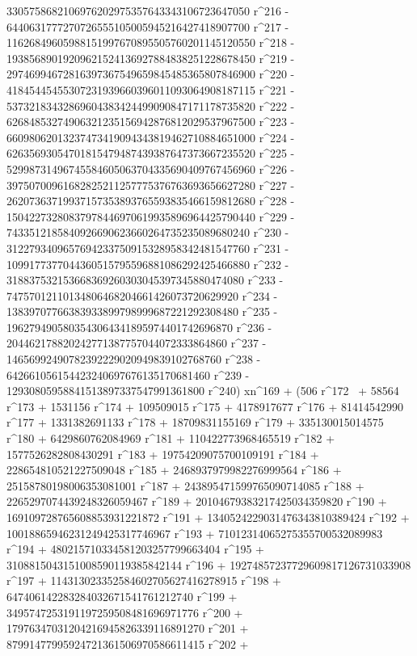        3305758682106976202975357643343106723647050 r^216 - 
       6440631777270726555105005945216427418907700 r^217 - 
       11626849605988151997670895505760201145120550 r^218 - 
       19385689019209621524136927884838251228678450 r^219 - 
       29746994672816397367549659845485365807846900 r^220 - 
       41845445455307231939660396011093064908187115 r^221 - 
       53732183432869604383424499090847171178735820 r^222 - 
       62684853274906321235156942876812029537967500 r^223 - 
       66098062013237473419094343819462710884651000 r^224 - 
       62635693054701815479487439387647373667235520 r^225 - 
       52998731496745584605063704335690409767456960 r^226 - 
       39750700961682825211257775376763693656627280 r^227 - 
       26207363719937157353893765593835466159812680 r^228 - 
       15042273280837978446970619935896964425790440 r^229 - 
       7433512185840926690623660264735235089680240 r^230 - 
       3122793409657694233750915328958342481547760 r^231 - 
       1099177377044360515795596881086292425466880 r^232 - 
       318837532153668369260303045397345880474080 r^233 - 
       74757012110134806468204661426073720629920 r^234 - 
       13839707766383933899798999687221292308480 r^235 - 
       1962794905803543064341895974401742696870 r^236 - 
       204462178820242771387757044072333864860 r^237 - 
       14656992490782392229020949839102768760 r^238 - 
       642661056154423240697676135170681460 r^239 - 
       12930805958841513897337547991361800 r^240) xn^169 + (506 r^172 \
+ 58564 r^173 + 1531156 r^174 + 109509015 r^175 + 4178917677 r^176 + 
       81414542990 r^177 + 1331382691133 r^178 + 
       18709831155169 r^179 + 335130015014575 r^180 + 
       6429860762084969 r^181 + 110422773968465519 r^182 + 
       1577526282808430291 r^183 + 19754209075700109191 r^184 + 
       228654810521227509048 r^185 + 2468937979982276999564 r^186 + 
       25158780198006353081001 r^187 + 
       243895471599765090714085 r^188 + 
       2265297074439248326059467 r^189 + 
       20104679383217425034359820 r^190 + 
       169109728765608853931221872 r^191 + 
       1340524229031476343810389424 r^192 + 
       10018865946231249425317746967 r^193 + 
       71012314065275355700532089983 r^194 + 
       480215710334581203257799663404 r^195 + 
       3108815043151008590119385842144 r^196 + 
       19274857237729609817126731033908 r^197 + 
       114313023352584602705627416278915 r^198 + 
       647406142283284032671541761212740 r^199 + 
       3495747253191197259508481696971776 r^200 + 
       17976347031204216945826339116891270 r^201 + 
       87991477995924721361506970586611415 r^202 + 
